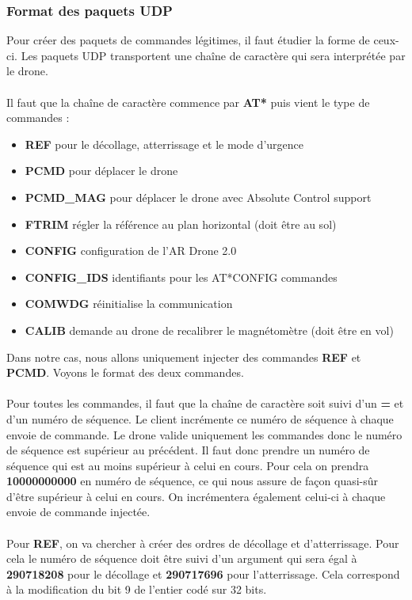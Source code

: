 \subsubsection{Format des paquets UDP}
Pour créer des paquets de commandes légitimes, il faut étudier la forme de ceux-ci. Les paquets UDP transportent une chaîne de caractère qui sera interprétée par le drone.\\\\
Il faut que la chaîne de caractère commence par \textbf{AT*} puis vient le type de commandes :
\begin{itemize}
\item \textbf{REF} pour le décollage, atterrissage et le mode d'urgence
\item \textbf{PCMD} pour déplacer le drone
\item \textbf{PCMD\_MAG} pour déplacer le drone avec Absolute Control support
\item \textbf{FTRIM} régler la référence au plan horizontal (doit être au sol)
\item \textbf{CONFIG} configuration de l'AR Drone 2.0
\item \textbf{CONFIG\_IDS} identifiants pour les AT*CONFIG commandes
\item \textbf{COMWDG} réinitialise la communication
\item \textbf{CALIB} demande au drone de recalibrer le magnétomètre (doit être en vol) 
\end{itemize}
Dans notre cas, nous allons uniquement injecter des commandes \textbf{REF} et \textbf{PCMD}. Voyons le format des deux commandes.\\\\
Pour toutes les commandes, il faut que la chaîne de caractère soit suivi d'un \textbf{=} et d'un numéro de séquence. Le client incrémente ce numéro de séquence à chaque envoie de commande. Le drone valide uniquement les commandes donc le numéro de séquence est supérieur au précédent. Il faut donc prendre un numéro de séquence qui est au moins supérieur à celui en cours. Pour cela on prendra \textbf{10000000000} en numéro de séquence, ce qui nous assure de façon quasi-sûr d'être supérieur à celui en cours. On incrémentera également celui-ci à chaque envoie de commande injectée.\\\\
Pour \textbf{REF}, on va chercher à créer des ordres de décollage et d’atterrissage. Pour cela le numéro de séquence doit être suivi d'un argument qui sera égal à \textbf{290718208} pour le décollage et \textbf{290717696} pour l'atterrissage. Cela correspond à la modification du bit 9 de l'entier codé sur 32 bits.\\\\

